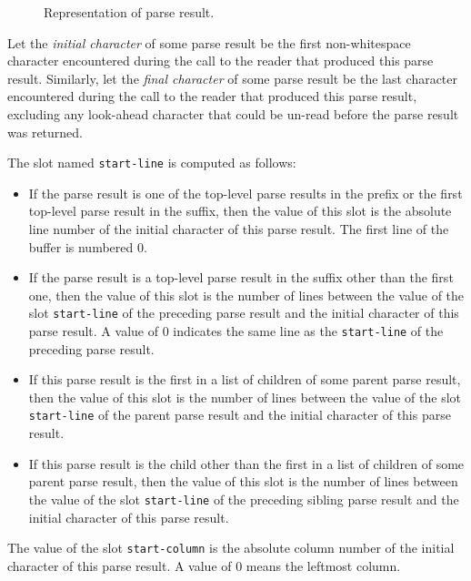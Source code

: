 \begin{figure}
\begin{center}
\end{center}
\caption{\label{fig-parse-result}
Representation of parse result.}
\end{figure}

Let the \emph{initial character} of some parse result be the first
non-whitespace character encountered during the call to the reader
that produced this parse result.  Similarly, let the \emph{final
  character} of some parse result be the last character encountered
during the call to the reader that produced this parse result,
excluding any look-ahead character that could be un-read before the
parse result was returned.

The slot named \texttt{start-line} is computed as follows:

\begin{itemize}
\item If the parse result is one of the top-level parse results in the
  prefix or the first top-level parse result in the suffix, then the
  value of this slot is the absolute line number of the initial
  character of this parse result.  The first line of the buffer is
  numbered $0$.
\item If the parse result is a top-level parse result in the suffix
  other than the first one, then the value of this slot is the number
  of lines between the value of the slot \texttt{start-line} of the
  preceding parse result and the initial character of this parse
  result.  A value of $0$ indicates the same line as the
  \texttt{start-line} of the preceding parse result.
\item If this parse result is the first in a list of children of some
  parent parse result, then the value of this slot is the number of
  lines between the value of the slot \texttt{start-line} of the parent
  parse result and the initial character of this parse result.
\item If this parse result is the child other than the first in a list
  of children of some parent parse result, then the value of this slot
  is the number of lines between the value of the slot
  \texttt{start-line} of the preceding sibling parse result and the
  initial character of this parse result.
\end{itemize}

The value of the slot \texttt{start-column} is the absolute column
number of the initial character of this parse result.  A value of $0$
means the leftmost column.

